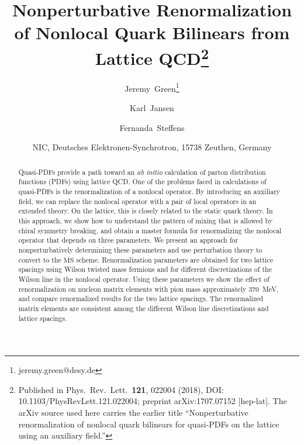 \documentclass[11pt]{article}
\newcommand{\MSbar}{\overline{\text{MS}}}
\begin{document}
\title{Nonperturbative Renormalization of Nonlocal Quark Bilinears
  from Lattice QCD\thanks{Published in Phys.\ Rev.\ Lett.\ \textbf{121},
  022004 (2018), DOI: 10.1103/PhysRevLett.121.022004;
  preprint arXiv:1707.07152 [hep-lat]. The arXiv source used here
  carries the earlier title ``Nonperturbative renormalization of
  nonlocal quark bilinears for quasi-PDFs on the lattice using an
  auxiliary field.''}}
\author{Jeremy~Green\thanks{jeremy.green@desy.de}}
\author{Karl~Jansen}
\author{Fernanda~Steffens}
\date{NIC, Deutsches Elektronen-Synchrotron, 15738 Zeuthen, Germany}

\maketitle

\begin{abstract}
  Quasi-PDFs provide a path toward an \emph{ab initio} calculation of
  parton distribution functions (PDFs) using lattice QCD. One of the
  problems faced in calculations of quasi-PDFs is the renormalization
  of a nonlocal operator. By introducing an auxiliary field, we can
  replace the nonlocal operator with a pair of local operators in an
  extended theory. On the lattice, this is closely related to the
  static quark theory. In this approach, we show how to understand the
  pattern of mixing that is allowed by chiral symmetry breaking, and
  obtain a master formula for renormalizing the nonlocal operator that
  depends on three parameters. We present an approach for
  nonperturbatively determining these parameters and use perturbation
  theory to convert to the $\MSbar$ scheme. Renormalization parameters
  are obtained for two lattice spacings using Wilson twisted mass
  fermions and for different discretizations of the Wilson line in the
  nonlocal operator. Using these parameters we show the effect of
  renormalization on nucleon matrix elements with pion mass
  approximately 370~MeV, and compare renormalized results for the two
  lattice spacings. The renormalized matrix elements are consistent
  among the different Wilson line discretizations and lattice
  spacings.
\end{abstract}



\end{document}
